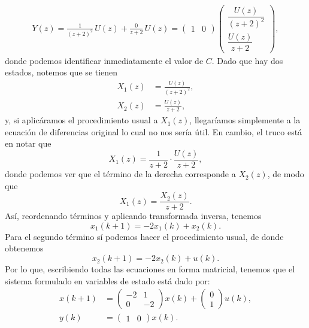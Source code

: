 \documentclass[
  11pt,
  letterpaper,
   addpoints,
  answers
  ]{exam}
\begin{document}
\begin{questions}
\begin{solution}
\begin{align}
Y(z) = \frac{1}{(z+2)^{2}}\,U(z)+\frac{0}{z+2}\,U(z) \nonumber = \begin{pmatrix}1 & 0\end{pmatrix}
        \begin{pmatrix}
        \dfrac{U(z)}{(z+2)^{2}}\\[6pt]
        \dfrac{U(z)}{z+2}
        \end{pmatrix},
\end{align}
donde podemos identificar inmediatamente el valor de $C$. Dado que hay dos estados, notemos que se tienen
\begin{align}
X_{1}(z) &= \frac{U(z)}{(z+2)^{2}},\\
X_{2}(z) &= \frac{U(z)}{z+2},
\end{align}
y, si aplicáramos el procedimiento usual a $X_{1}(z)$, llegaríamos simplemente a la ecuación de diferencias original lo cual no nos sería útil. En cambio, el truco está en notar que
\begin{equation}
X_{1}(z)=\frac{1}{z+2}\cdot\frac{U(z)}{z+2},
\end{equation}
donde podemos ver que el término de la derecha corresponde a $X_{2}(z)$, de modo que
\begin{equation}
X_{1}(z)=\frac{X_{2}(z)}{z+2}.
\end{equation}
Así, reordenando términos y aplicando transformada inversa, tenemos
\begin{equation}
x_{1}(k+1)=-2x_{1}(k)+x_{2}(k).
\end{equation}
Para el segundo término sí podemos hacer el procedimiento usual, de donde obtenemos
\begin{equation}
x_{2}(k+1)=-2x_{2}(k)+u(k).
\end{equation}
Por lo que, escribiendo todas las ecuaciones en forma matricial, tenemos que el sistema formulado en variables de estado está dado por:
\begin{align}
x(k+1) &=
\begin{pmatrix}
-2 & 1\\
0  & -2
\end{pmatrix}x(k)+
\begin{pmatrix}
0\\ 1
\end{pmatrix}u(k),\\[4pt]
y(k) &= \begin{pmatrix}1 & 0\end{pmatrix}x(k).
\end{align}


\end{solution}
\end{questions}
\end{document}
